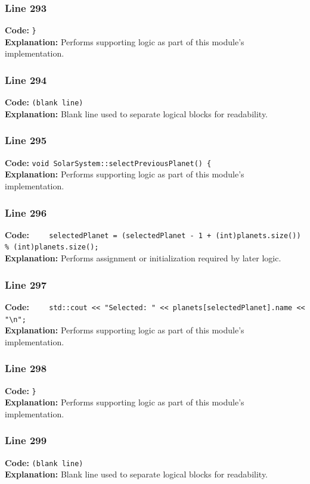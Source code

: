 \documentclass[11pt,a4paper]{article}
\begin{document}
\subsubsection*{Line 293}
\textbf{Code:} \verb|}|\\
\textbf{Explanation:} Performs supporting logic as part of this module's implementation.

\subsubsection*{Line 294}
\textbf{Code:} \texttt{(blank line)}\\
\textbf{Explanation:} Blank line used to separate logical blocks for readability.

\subsubsection*{Line 295}
\textbf{Code:} \verb|void SolarSystem::selectPreviousPlanet() {|\\
\textbf{Explanation:} Performs supporting logic as part of this module's implementation.

\subsubsection*{Line 296}
\textbf{Code:} \verb|    selectedPlanet = (selectedPlanet - 1 + (int)planets.size()) % (int)planets.size();|\\
\textbf{Explanation:} Performs assignment or initialization required by later logic.

\subsubsection*{Line 297}
\textbf{Code:} \verb|    std::cout << "Selected: " << planets[selectedPlanet].name << "\n";|\\
\textbf{Explanation:} Performs supporting logic as part of this module's implementation.

\subsubsection*{Line 298}
\textbf{Code:} \verb|}|\\
\textbf{Explanation:} Performs supporting logic as part of this module's implementation.

\subsubsection*{Line 299}
\textbf{Code:} \texttt{(blank line)}\\
\textbf{Explanation:} Blank line used to separate logical blocks for readability.
\end{document}
